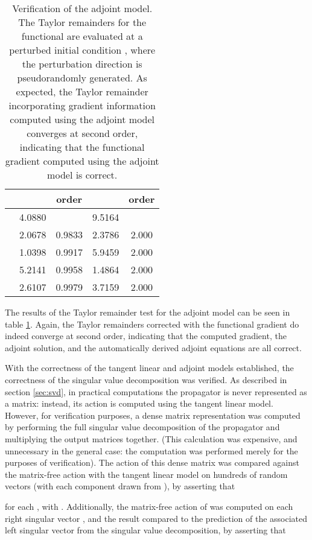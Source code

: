 \documentclass{siamltex}
\begin{document}
\begin{table}
\centering
\begin{tabular}{ccccc}
\toprule
 & \small{} & order & \small{} & order \\
\midrule
 & 4.0880  &    & 9.5164  & \\
 & 2.0678   & 0.9833 & 2.3786  & 2.000 \\
 & 1.0398  & 0.9917 &  5.9459  & 2.000 \\
 & 5.2141  & 0.9958 & 1.4864  & 2.000 \\
 & 2.6107  & 0.9979 &  3.7159  & 2.000 \\
\bottomrule
\end{tabular}
\caption{Verification of the adjoint model. The Taylor remainders for the functional
   are evaluated at a perturbed initial condition
  , where the perturbation
  direction  is pseudorandomly generated. As expected, the
  Taylor remainder incorporating gradient information computed using
  the adjoint model converges at second order, indicating that
  the functional gradient computed using the adjoint model is
  correct.}
\label{tab:burgers_adj}
\end{table}

The results of the Taylor remainder test for the
adjoint model can be seen in table \ref{tab:burgers_adj}. Again, the Taylor remainders corrected with
the functional gradient do indeed converge at second order, indicating that the computed gradient, the adjoint
solution, and the automatically derived adjoint equations are all correct.

With the correctness of the tangent linear and adjoint models established, the correctness of
the singular value decomposition was verified. As described in section \ref{sec:svd}, in practical
computations the propagator is never represented as a matrix: instead, its action is computed
using the tangent linear model. However, for verification purposes, a dense matrix representation  was
computed by performing the full singular value decomposition
of the propagator and multiplying the output matrices together.
(This calculation was expensive, and unnecessary in the general
case: the computation was performed merely for the purposes of verification). The action of this dense matrix
was compared against the matrix-free action with the tangent linear model on hundreds of random vectors  (with
each component drawn from ), by asserting that

for each , with .
Additionally, the matrix-free action of  was computed on each right singular vector , and the
result compared to the prediction of the associated left singular vector from the singular value decomposition, by asserting that
\end{document}
